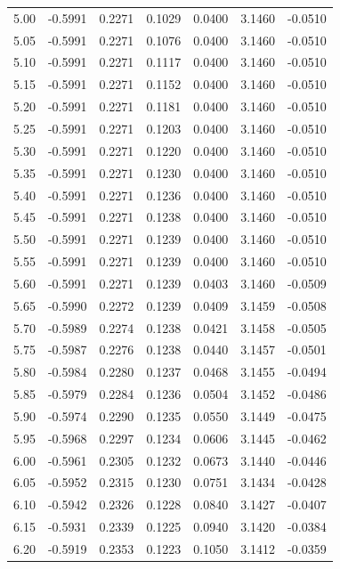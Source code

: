 \begin{longtable}{|c|c|c|c|c|c|c|}
5.00 & -0.5991 & 0.2271 & 0.1029 & 0.0400 & 3.1460 & -0.0510 \\
5.05 & -0.5991 & 0.2271 & 0.1076 & 0.0400 & 3.1460 & -0.0510 \\
5.10 & -0.5991 & 0.2271 & 0.1117 & 0.0400 & 3.1460 & -0.0510 \\
5.15 & -0.5991 & 0.2271 & 0.1152 & 0.0400 & 3.1460 & -0.0510 \\
5.20 & -0.5991 & 0.2271 & 0.1181 & 0.0400 & 3.1460 & -0.0510 \\
5.25 & -0.5991 & 0.2271 & 0.1203 & 0.0400 & 3.1460 & -0.0510 \\
5.30 & -0.5991 & 0.2271 & 0.1220 & 0.0400 & 3.1460 & -0.0510 \\
5.35 & -0.5991 & 0.2271 & 0.1230 & 0.0400 & 3.1460 & -0.0510 \\
5.40 & -0.5991 & 0.2271 & 0.1236 & 0.0400 & 3.1460 & -0.0510 \\
5.45 & -0.5991 & 0.2271 & 0.1238 & 0.0400 & 3.1460 & -0.0510 \\
5.50 & -0.5991 & 0.2271 & 0.1239 & 0.0400 & 3.1460 & -0.0510 \\
5.55 & -0.5991 & 0.2271 & 0.1239 & 0.0400 & 3.1460 & -0.0510 \\
5.60 & -0.5991 & 0.2271 & 0.1239 & 0.0403 & 3.1460 & -0.0509 \\
5.65 & -0.5990 & 0.2272 & 0.1239 & 0.0409 & 3.1459 & -0.0508 \\
5.70 & -0.5989 & 0.2274 & 0.1238 & 0.0421 & 3.1458 & -0.0505 \\
5.75 & -0.5987 & 0.2276 & 0.1238 & 0.0440 & 3.1457 & -0.0501 \\
5.80 & -0.5984 & 0.2280 & 0.1237 & 0.0468 & 3.1455 & -0.0494 \\
5.85 & -0.5979 & 0.2284 & 0.1236 & 0.0504 & 3.1452 & -0.0486 \\
5.90 & -0.5974 & 0.2290 & 0.1235 & 0.0550 & 3.1449 & -0.0475 \\
5.95 & -0.5968 & 0.2297 & 0.1234 & 0.0606 & 3.1445 & -0.0462 \\
6.00 & -0.5961 & 0.2305 & 0.1232 & 0.0673 & 3.1440 & -0.0446 \\
6.05 & -0.5952 & 0.2315 & 0.1230 & 0.0751 & 3.1434 & -0.0428 \\
6.10 & -0.5942 & 0.2326 & 0.1228 & 0.0840 & 3.1427 & -0.0407 \\
6.15 & -0.5931 & 0.2339 & 0.1225 & 0.0940 & 3.1420 & -0.0384 \\
6.20 & -0.5919 & 0.2353 & 0.1223 & 0.1050 & 3.1412 & -0.0359 \\

\end{longtable}
